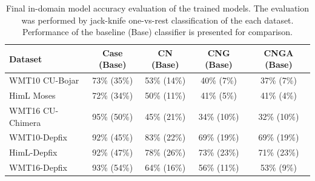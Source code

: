 \begin{table}[t]
\centering
\small

\begin{tabular}{l|cccc}
Dataset  &  Case (Base)  &  CN (Base)  & CNG (Base)  &  CNGA (Base)  \\
\hline
WMT10 CU-Bojar  &  73\% (35\%)  &  53\% (14\%)  &  40\% (7\%)  &  37\% (7\%)  \\
HimL Moses &  72\% (34\%)  &  50\% (11\%)  & 41\% (5\%)  &  41\% (4\%)  \\
WMT16 CU-Chimera  &  95\% (50\%)  &  45\% (21\%)  &  34\% (10\%)  &  32\% (10\%)  \\
WMT10-Depfix  &  92\% (45\%)  &  83\% (22\%)  &  69\% (19\%)  &  69\% (19\%)  \\
HimL-Depfix  &  92\% (47\%)  &  78\% (26\%)  &  73\% (23\%)  &  71\% (23\%)  \\
WMT16-Depfix  &  93\% (54\%)  &  64\% (16\%)  &  56\% (11\%)  &  53\% (9\%)  \\
\end{tabular}
\caption{
    Final in-domain model accuracy evaluation of the trained models. The evaluation was performed
by jack-knife one-vs-rest classification of the each dataset. Performance of the baseline (Base)
classifier is presented for comparison.
}
\label{cats-summary}
\end{table}



